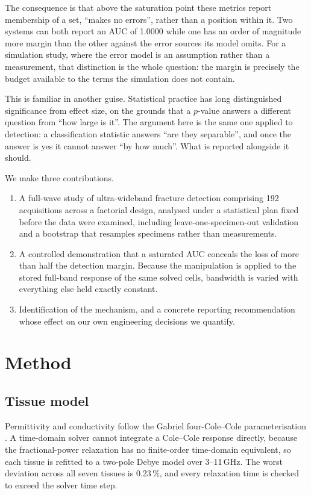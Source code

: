 \documentclass[conference]{IEEEtran}
\begin{document}
The consequence is that above the saturation point these metrics report
membership of a set, ``makes no errors'', rather than a position within it.
Two systems can both report an AUC of 1.0000 while one has an order of
magnitude more margin than the other against the error sources its model
omits. For a simulation study, where the error model is an assumption rather
than a measurement, that distinction is the whole question: the margin is
precisely the budget available to the terms the simulation does not contain.

This is familiar in another guise. Statistical practice has long
distinguished significance from effect size, on the grounds that a $p$-value
answers a different question from ``how large is it''. The argument here is
the same one applied to detection: a classification statistic answers
``are they separable'', and once the answer is yes it cannot answer ``by how
much''. What is reported alongside it should.

We make three contributions.

\begin{enumerate}
\item A full-wave study of ultra-wideband fracture detection comprising 192
acquisitions across a factorial design, analysed under a statistical plan
fixed before the data were examined, including leave-one-specimen-out
validation and a bootstrap that resamples specimens rather than
measurements.
\item A controlled demonstration that a saturated AUC conceals the loss of
more than half the detection margin. Because the manipulation is applied to
the stored full-band response of the same solved cells, bandwidth is varied
with everything else held exactly constant.
\item Identification of the mechanism, and a concrete reporting
recommendation whose effect on our own engineering decisions we quantify.
\end{enumerate}

\section{Method}

\subsection{Tissue model}
Permittivity and conductivity follow the Gabriel four-Cole--Cole
parameterisation \cite{gabriel}. A time-domain solver cannot integrate a
Cole--Cole response directly, because the fractional-power relaxation has no
finite-order time-domain equivalent, so each tissue is refitted to a
two-pole Debye model over 3--11\,GHz. The worst deviation across all seven
tissues is 0.23\,\%, and every relaxation time is checked to exceed the
solver time step.
\end{document}
